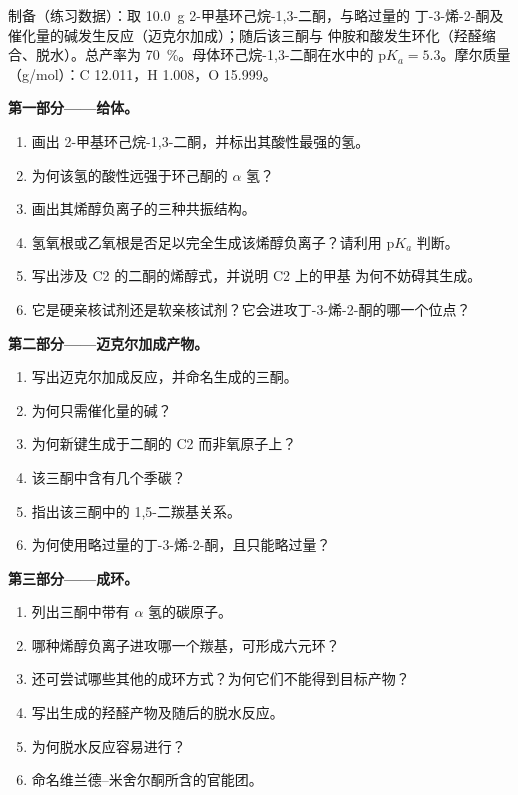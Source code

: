 \begin{problem}
\label{pb:b2:conjugate-additions:1}
制备（练习数据）：取 \qty{10.0}{g} 2-甲基环己烷-1,3-二酮，与略过量的
丁-3-烯-2-酮及催化量的碱发生反应（迈克尔加成）；随后该三酮与
仲胺和酸发生环化（羟醛缩合、脱水）。总产率为 70~\%。母体环己烷-1,3-二酮在水中的
$\mathrm pK_a = 5.3$。摩尔质量（\unit{g/mol}）：C 12.011，H 1.008，O 15.999。

\medskip
\noindent\textbf{第一部分——给体。}
\begin{enumerate}
  \item 画出 2-甲基环己烷-1,3-二酮，并标出其酸性最强的氢。
  \item 为何该氢的酸性远强于环己酮的 $\alpha$ 氢？
  \item 画出其烯醇负离子的三种共振结构。
  \item 氢氧根或乙氧根是否足以完全生成该烯醇负离子？请利用 $\mathrm pK_a$ 判断。
  \item 写出涉及 C2 的二酮的烯醇式，并说明 C2 上的甲基
        为何不妨碍其生成。
  \item 它是硬亲核试剂还是软亲核试剂？它会进攻丁-3-烯-2-酮的哪一个位点？
\end{enumerate}

\medskip
\noindent\textbf{第二部分——迈克尔加成产物。}
\begin{enumerate}[resume]
  \item 写出迈克尔加成反应，并命名生成的三酮。
  \item 为何只需催化量的碱？
  \item 为何新键生成于二酮的 C2 而非氧原子上？
  \item 该三酮中含有几个季碳？
  \item 指出该三酮中的 1,5-二羰基关系。
  \item 为何使用略过量的丁-3-烯-2-酮，且只能略过量？
\end{enumerate}

\medskip
\noindent\textbf{第三部分——成环。}
\begin{enumerate}[resume]
  \item 列出三酮中带有 $\alpha$ 氢的碳原子。
  \item 哪种烯醇负离子进攻哪一个羰基，可形成六元环？
  \item 还可尝试哪些其他的成环方式？为何它们不能得到目标产物？
  \item 写出生成的羟醛产物及随后的脱水反应。
  \item 为何脱水反应容易进行？
  \item 命名维兰德–米舍尔酮所含的官能团。
\end{enumerate}


\end{problem}
